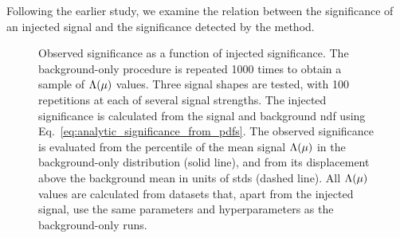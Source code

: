 \documentclass[paper/ddppaper2.tex]{subfiles}
\begin{document}
Following the earlier study, we examine the relation between the significance of an injected signal and the significance detected by the method.

\begin{figure}
    \caption{Observed significance as a function of injected significance. The background-only procedure is repeated 1000 times to obtain a sample of $\Lambda({\mu})$ values. Three signal shapes are tested, with 100 repetitions at each of several signal strengths. The injected significance is calculated from the signal and background \gls{ndf} using Eq.~\ref{eq:analytic_significance_from_pdfs}. The observed significance is evaluated from the percentile of the mean signal $\Lambda({\mu})$ in the background-only distribution (solid line), and from its displacement above the background mean in units of \glspl{std} (dashed line). All $\Lambda({\mu})$ values are calculated from datasets that, apart from the injected signal, use the same parameters and hyperparameters as the background-only runs.}
    \label{fig:observed_vs_injected_significances}
\end{figure}
\end{document}
